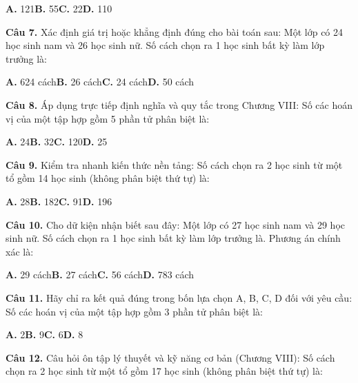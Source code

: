 \documentclass[11pt,a4paper]{article}
\begin{document}
\hspace*{1.5em}\textbf{A.} 121\quad\quad \textbf{B.} 55\quad\quad \textbf{C.} 22\quad\quad \textbf{D.} 110\par\vspace{2pt}
\textbf{\color{primary} Câu 7.} Xác định giá trị hoặc khẳng định đúng cho bài toán sau: Một lớp có 24 học sinh nam và 26 học sinh nữ. Số cách chọn ra 1 học sinh bất kỳ làm lớp trưởng là:\par
\hspace*{1.5em}\textbf{A.} 624 cách\quad\quad \textbf{B.} 26 cách\quad\quad \textbf{C.} 24 cách\quad\quad \textbf{D.} 50 cách\par\vspace{2pt}
\textbf{\color{primary} Câu 8.} Áp dụng trực tiếp định nghĩa và quy tắc trong Chương VIII: Số các hoán vị của một tập hợp gồm 5 phần tử phân biệt là:\par
\hspace*{1.5em}\textbf{A.} 24\quad\quad \textbf{B.} 32\quad\quad \textbf{C.} 120\quad\quad \textbf{D.} 25\par\vspace{2pt}
\textbf{\color{primary} Câu 9.} Kiểm tra nhanh kiến thức nền tảng: Số cách chọn ra 2 học sinh từ một tổ gồm 14 học sinh (không phân biệt thứ tự) là:\par
\hspace*{1.5em}\textbf{A.} 28\quad\quad \textbf{B.} 182\quad\quad \textbf{C.} 91\quad\quad \textbf{D.} 196\par\vspace{2pt}
\textbf{\color{primary} Câu 10.} Cho dữ kiện nhận biết sau đây: Một lớp có 27 học sinh nam và 29 học sinh nữ. Số cách chọn ra 1 học sinh bất kỳ làm lớp trưởng là. Phương án chính xác là:\par
\hspace*{1.5em}\textbf{A.} 29 cách\quad\quad \textbf{B.} 27 cách\quad\quad \textbf{C.} 56 cách\quad\quad \textbf{D.} 783 cách\par\vspace{2pt}
\textbf{\color{primary} Câu 11.} Hãy chỉ ra kết quả đúng trong bốn lựa chọn A, B, C, D đối với yêu cầu: Số các hoán vị của một tập hợp gồm 3 phần tử phân biệt là:\par
\hspace*{1.5em}\textbf{A.} 2\quad\quad \textbf{B.} 9\quad\quad \textbf{C.} 6\quad\quad \textbf{D.} 8\par\vspace{2pt}
\textbf{\color{primary} Câu 12.} Câu hỏi ôn tập lý thuyết và kỹ năng cơ bản (Chương VIII): Số cách chọn ra 2 học sinh từ một tổ gồm 17 học sinh (không phân biệt thứ tự) là:\par
\end{document}
